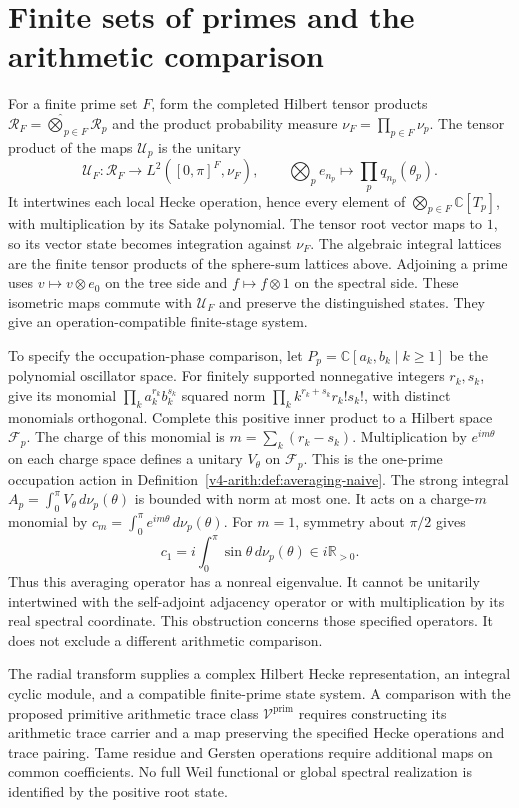 \section{Finite sets of primes and the arithmetic comparison}
\label{v4-arith:radial:finite}

For a finite prime set $F$, form the completed Hilbert tensor products
$\mathcal R_F=\widehat\bigotimes_{p\in F}\mathcal R_p$ and the product
probability measure $\nu_F=\prod_{p\in F}\nu_p$.
The tensor product of the maps $\mathcal U_p$ is the unitary
\[
 \mathcal U_F:\mathcal R_F\longrightarrow
 L^2([0,\pi]^F,\nu_F),\qquad
 \bigotimes_pe_{n_p}\longmapsto\prod_pq_{n_p}(\theta_p).
\]
It intertwines each local Hecke operation, hence every element of
$\bigotimes_{p\in F}\mathbb C[T_p]$, with multiplication by its
Satake polynomial. The tensor root vector maps to $1$, so its vector
state becomes integration against $\nu_F$. The algebraic integral
lattices are the finite tensor products of the sphere-sum lattices above.
Adjoining a prime uses $v\mapsto v\otimes e_0$ on the tree side and
$f\mapsto f\otimes1$ on the spectral side. These isometric maps
commute with $\mathcal U_F$ and preserve the distinguished states.
They give an operation-compatible finite-stage system.

To specify the occupation-phase comparison, let
$P_p=\mathbb C[a_k,b_k\mid k\ge1]$ be the polynomial oscillator space.
For finitely supported nonnegative integers $r_k,s_k$, give its monomial
$\prod_k a_k^{r_k}b_k^{s_k}$ squared norm
$\prod_k k^{r_k+s_k}r_k!s_k!$, with distinct monomials orthogonal.
Complete this positive inner product to a Hilbert space $\mathcal F_p$.
The charge of this monomial is $m=\sum_k(r_k-s_k)$.
Multiplication by $e^{im\theta}$ on each charge space defines a unitary
$V_\theta$ on $\mathcal F_p$. This is the one-prime occupation action in
Definition~\ref{v4-arith:def:averaging-naive}. The strong integral
$A_p=\int_0^\pi V_\theta\,d\nu_p(\theta)$ is bounded with norm at most one.
It acts on a charge-$m$ monomial by
$c_m=\int_0^\pi e^{im\theta}\,d\nu_p(\theta)$.
For $m=1$, symmetry about $\pi/2$ gives
\[
 c_1=i\int_0^\pi\sin\theta\,d\nu_p(\theta)\in i\mathbb R_{>0}.
\]
Thus this averaging operator has a nonreal eigenvalue. It cannot be
unitarily intertwined with the self-adjoint adjacency operator or
with multiplication by its real spectral coordinate.
This obstruction concerns those specified operators. It does not
exclude a different arithmetic comparison.

The radial transform supplies a complex Hilbert Hecke representation,
an integral cyclic module, and a compatible finite-prime state system.
A comparison with the proposed primitive arithmetic trace class
$\mathcal V^{\mathrm{prim}}$ requires constructing
its arithmetic trace carrier and a map preserving the specified Hecke
operations and trace pairing. Tame residue and Gersten operations
require additional maps on common coefficients.
No full Weil functional or global spectral realization is identified
by the positive root state.
